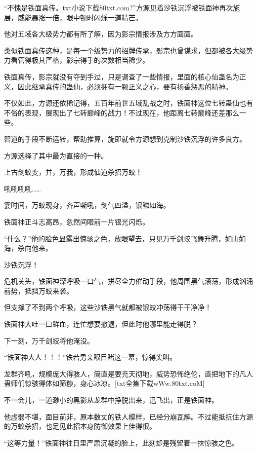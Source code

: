 
\begin{this_body}

“不愧是铁面真传。txt小说下载80txt.com?”方源见着沙铁沉浮被铁面神再次施展，威能暴涨一倍，眼中顿时闪烁一道精芒。

他对五域各大级势力都有所了解，因为影宗情报涉及方方面面。

类似铁面真传这种，是每一个级势力的招牌传承，影宗也曾谋求，但都被各大级势力看管得极其严格，影宗得手的次数相当稀少。

铁面真传，影宗就没有夺到手过，只是调查了一些情报，里面的核心仙蛊名为正义，因此继承真传的蛊仙，必须拥有一颗正义之心，要有扬善惩恶的精神。

不仅如此，方源还依稀记得，五百年前世五域乱战之时，铁面神这位七转蛊仙也有不俗的表现，展现出了七转巅峰的战力！不过现在，他距离七转巅峰还差那么一些。

智道的手段不断运转，帮助推算，旋即就令方源想到克制沙铁沉浮的许多良方。

方源选择了其中最为直接的一种。

上古剑蛟变，并，万我，形成仙道杀招万蛟！

吼吼吼吼……

霎时间，万蛟现身，齐声嘶吼，剑气四溢，银鳞如海。

铁面神正斗志高昂，忽然间眼前一片银光闪烁。

“什么？”他的脸色显露出惊骇之色，放眼望去，只见万千剑蛟飞舞升腾，如山如海，杀向他来。

沙铁沉浮！

危机关头，铁面神深呼吸一口气，拼尽全力催动手段，他周围黑气滚荡，形成汹涌前势，抵挡万蛟来袭。

但支撑了不到两个呼吸，这些沙铁黑气就都被银蛟冲荡得干干净净！

铁面神大吐一口鲜血，连忙想要撤退，但此时他哪里能走得脱？

下一刻，万千剑蛟将他淹没。

“铁面神大人！！！”铁若男亲眼目睹这一幕，惊得尖叫。

龙群齐吼，规模庞大得骇人，简直是要充天彻地，威势恐怖绝伦，直把地下的凡人蛊师们惊骇得体如筛糠，身心冰凉。[txt全集下载wWw.80txt.coM]

不一会儿，一道渺小的黑影从龙群中挣脱出来，迅飞出，正是铁面神。

他虚弱不堪，面目前非，原本数丈的铁人模样，已经分崩瓦解。不过能抵抗住方源的万蛟杀招，也足见此招本身防御效果上佳得很。

“这等力量！”铁面神往日里严肃沉凝的脸上，此刻却是残留着一抹惊骇之色。


\end{this_body}
